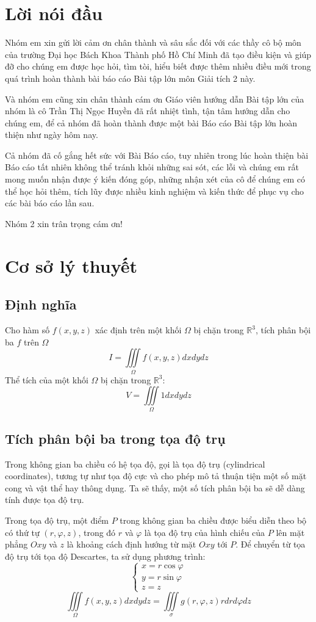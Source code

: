 \documentclass[12pt,a4paper]{article}
\begin{document}
\onehalfspacing
\tableofcontents
\newpage
\section{Lời nói đầu}
Nhóm em xin gửi lời cảm ơn chân thành và sâu sắc đối với các thầy cô bộ môn của trường Đại học Bách Khoa Thành phố Hồ Chí Minh đã tạo điều kiện và giúp đỡ cho chúng em được học hỏi, tìm tòi, hiểu biết được thêm nhiều điều mới trong quá trình hoàn thành bài báo cáo Bài tập lớn môn Giải tích 2 này.

Và nhóm em cũng xin chân thành cám ơn Giáo viên hướng dẫn Bài tập lớn của nhóm là cô Trần Thị Ngọc Huyền đã rất nhiệt tình, tận tâm hướng dẫn cho chúng em, để cả nhóm đã hoàn thành được một bài Báo cáo Bài tập lớn hoàn thiện như ngày hôm nay.

Cả nhóm đã cố gắng hết sức với Bài Báo cáo, tuy nhiên trong lúc hoàn thiện bài Báo cáo tất nhiên không thể tránh khỏi những sai sót, các lỗi và chúng em rất mong muốn nhận được ý kiến đóng góp, những nhận xét của cô để chúng em có thể học hỏi thêm, tích lũy được nhiều kinh nghiệm và kiến thức để phục vụ cho các bài báo cáo lần sau.

Nhóm 2 xin trân trọng cám ơn!
\newpage
\section{Cơ sở lý thuyết}
\subsection{Định nghĩa}
Cho hàm số $f(x,y,z)$ xác định trên một khối $\Omega$ bị chặn trong $\mathbb{R}^3$, tích phân bội ba $f$ trên $\Omega$
\[
    I = \iiint \limits_\Omega f(x,y,z) dxdydz
\]
Thể tích của một khối $\Omega$ bị chặn trong $\mathbb{R}^3$:
\[
    V = \iiint \limits_\Omega 1 dxdydz
\]
\subsection{Tích phân bội ba trong tọa độ trụ}
Trong không gian ba chiều có hệ tọa độ, gọi là tọa độ trụ (cylindrical coordinates), tương tự như tọa độ cực và cho phép mô tả thuận tiện một số mặt cong và vật thể hay thông dụng. Ta sẽ thấy, một số tích phân bội ba sẽ dễ dàng tính được tọa độ trụ.

Trong tọa độ trụ, một điểm $P$ trong không gian ba chiều được biểu diễn theo bộ có thứ tự $(r,\varphi,z)$, trong đó $r$ và $\varphi$ là tọa độ trụ của hình chiếu của $P$ lên mặt phẳng $Oxy$ và $z$ là khoảng cách định hướng từ mặt $Oxy$ tới $P$. Để chuyển từ tọa độ trụ tới tọa độ Descartes, ta sử dụng phương trình:
\[
    \begin{cases}
        x = r\cos \varphi \\
        y = r\sin \varphi \\
        z = z
    \end{cases}    
\]
\[
    \iiint \limits_\Omega f(x,y,z)dxdydz = \iiint \limits_\sigma g(r,\varphi,z)rdrd\varphi dz
\]
\end{document}
